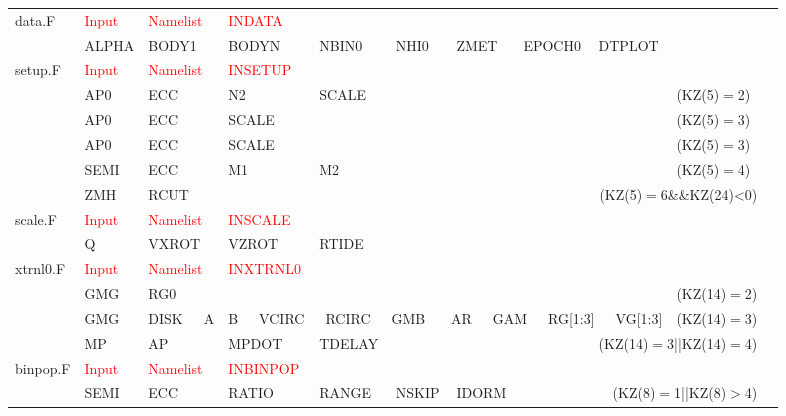 {\begin{longtable}{|p{0.6in}|*{10}{l}|}
data.F & \textcolor{red}{Input}& \textcolor{red}{Namelist}&  \textcolor{red}{INDATA} &&&&&&&\\
       & ALPHA    & BODY1    & BODYN    & NBIN0    & NHI0     &
          ZMET     & EPOCH0   & DTPLOT   &          &          \\\hline
setup.F & \textcolor{red}{Input}& \textcolor{red}{Namelist}&  \textcolor{red}{INSETUP} &&&&&&&\\
         & AP0      & ECC      & N2       & SCALE   &       
         &          &          &          &(KZ(5)$=$2)&\\
         & AP0      & ECC      & SCALE    &         & 
         &          &          &          &(KZ(5)$=$3)&\\
         & AP0      & ECC      & SCALE    &         & 
&          &          &          &(KZ(5)$=$3)&\\
         & SEMI     & ECC      & M1       & M2      &
         &          &          &          &    (KZ(5)$=$4)&\\
         & ZMH      & RCUT     &          &         &
          \multicolumn{5}{r}{(KZ(5)$=$6\&\&KZ(24)<0)}&\\\hline

scale.F & \textcolor{red}{Input}& \textcolor{red}{Namelist}&  \textcolor{red}{INSCALE} &&&&&&&\\
         & Q        & VXROT    & VZROT    & RTIDE   &          
         &          &          &          &         &          \\ \hline

xtrnl0.F & \textcolor{red}{Input}& \textcolor{red}{Namelist}&  \textcolor{red}{INXTRNL0} &&&&&&&\\
         & GMG      & RG0      &          &         &
         &          &          &          &       (KZ(14)$=$2) & \\
         & GMG      & DISK~~~A &
         \multicolumn{6}{l}{B~~~VCIRC~~~RCIRC~~~GMB~~~
          AR~~~GAM~~~RG[1:3]~~~VG[1:3]} &       (KZ(14)$=$3) & \\
         & MP       & AP       & MPDOT    & TDELAY  &
         &           \multicolumn{4}{r}{(KZ(14)$=$3||KZ(14)$=$4)} & \\ \hline

binpop.F & \textcolor{red}{Input}& \textcolor{red}{Namelist}&  \textcolor{red}{INBINPOP} &&&&&&&\\
         & SEMI     & ECC      & RATIO    & RANGE   & NSKIP
         & IDORM    & \multicolumn{3}{r}{(KZ(8)$=$1||KZ(8)$>$4)} & \\ \hline


\end{longtable}}

